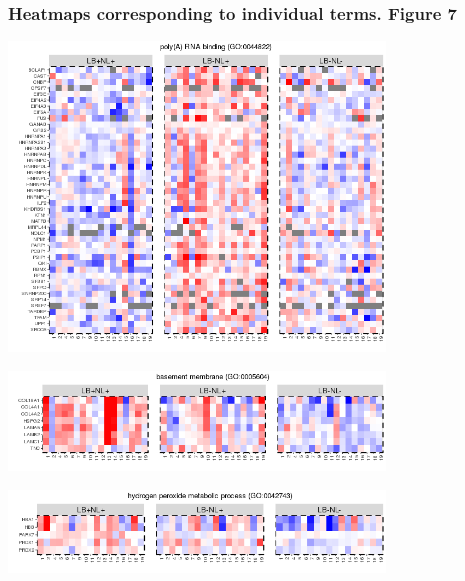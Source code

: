 \documentclass[11pt]{article}\usepackage[]{graphicx}\usepackage[usenames,dvipsnames]{color}
\newenvironment{knitrout}{}{} %
\begin{document}
\clearpage







\subsubsection{Heatmaps corresponding to individual terms. Figure 7}



\begin{knitrout}
\color{fgcolor}

{\centering \includegraphics[width=0.75\textwidth]{figure/toppath_heatmaps_5-1} 

}



\end{knitrout}
\begin{knitrout}
\color{fgcolor}

{\centering \includegraphics[width=0.75\textwidth]{figure/toppath_heatmaps_4-1} 

}



\end{knitrout}
\begin{knitrout}
\color{fgcolor}

{\centering \includegraphics[width=0.75\textwidth]{figure/toppath_heatmaps_3-1} 

}



\end{knitrout}
\end{document}

